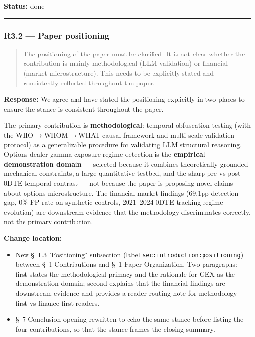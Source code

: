 \documentclass[11pt,a4paper]{article}
\begin{document}
\textbf{Status:} done

\bigskip\hrule\bigskip

\subsubsection*{R3.2 --- Paper positioning}

\begin{quote}
The positioning of the paper must be clarified. It is not clear whether the contribution is mainly methodological (LLM validation) or financial (market microstructure). This needs to be explicitly stated and consistently reflected throughout the paper.
\end{quote}

\textbf{Response:} We agree and have stated the positioning explicitly in
two places to ensure the stance is consistent throughout the paper.

The primary contribution is \textbf{methodological}: temporal obfuscation
testing (with the WHO$\rightarrow$WHOM$\rightarrow$WHAT causal framework and multi-scale
validation protocol) as a generalizable procedure for validating LLM
structural reasoning. Options dealer gamma-exposure regime detection is
the \textbf{empirical demonstration domain} --- selected because it combines
theoretically grounded mechanical constraints, a large quantitative
testbed, and the sharp pre-vs-post-0DTE temporal contrast --- not because
the paper is proposing novel claims about options microstructure. The
financial-market findings (69.1pp detection gap, 0\% FP rate on synthetic
controls, 2021--2024 0DTE-tracking regime evolution) are downstream
evidence that the methodology discriminates correctly, not the primary
contribution.

\textbf{Change location:}

\begin{itemize}
\item New \S{}~1.3 "Positioning" subsection (label \texttt{sec:introduction:positioning}) between \S{}~1 Contributions and \S{}~1 Paper Organization. Two paragraphs: first states the methodological primacy and the rationale for GEX as the demonstration domain; second explains that the financial findings are downstream evidence and provides a reader-routing note for methodology-first vs finance-first readers.
\item \S{}~7 Conclusion opening rewritten to echo the same stance before listing the four contributions, so that the stance frames the closing summary.
\end{itemize}
\end{document}
